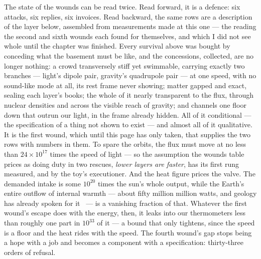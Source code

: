 \documentclass[fontsize=11pt,paper=a4,pagesize=auto,parskip=half-]{scrbook}
\begin{document}
The state of the wounds can be read twice. Read forward, it is a defence: six attacks, six replies, six invoices. Read backward, the same rows are a description of the layer below, assembled from measurements made at this one --- the reading the second and sixth wounds each found for themselves, and which I did not see whole until the chapter was finished. Every survival above was bought by conceding what the basement must be like, and the concessions, collected, are no longer nothing: a crowd transversely stiff yet swimmable, carrying exactly two branches --- light's dipole pair, gravity's quadrupole pair --- at one speed, with no sound-like mode at all, its rest frame never showing; matter gapped and exact, sealing each layer's books; the whole of it nearly transparent to the flux, through nuclear densities and across the visible reach of gravity; and channels one floor down that outrun our light, in the frame already hidden. All of it conditional --- the specification of a thing not shown to exist --- and almost all of it qualitative. It is the first wound, which until this page has only taken, that supplies the two rows with numbers in them. To spare the orbits, the flux must move at no less than $24\times10^{17}$ times the speed of light --- so the assumption the wounds table prices as doing duty in two rescues, \emph{lower layers are faster}, has its first rung measured, and by the toy's executioner. And the heat figure prices the valve. The demanded intake is some $10^{20}$ times the sun's whole output, while the Earth's entire outflow of internal warmth --- about fifty million million watts, and geology has already spoken for it~\cite{daviesdavies2010} --- is a vanishing fraction of that. Whatever the first wound's escape does with the energy, then, it leaks into our thermometers less than roughly one part in $10^{33}$ of it --- a bound that only tightens, since the speed is a floor and the heat rides with the speed. The fourth wound's gap stops being a hope with a job and becomes a component with a specification: thirty-three orders of refusal.
\end{document}
